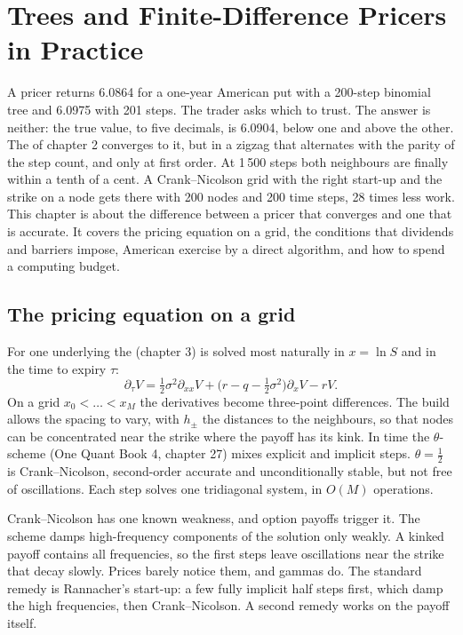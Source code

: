 \chapter{Trees and Finite-Difference Pricers in Practice}\label{ch:dv:trees-and-finite-difference-pricers-in-practice}

A pricer returns 6.0864 for a one-year American put with a 200-step binomial tree and 6.0975 with 201 steps. The trader
asks which to trust. The answer is neither: the true value, to five decimals, is 6.0904, below one and above the other. The
 of chapter 2 converges to it, but in a zigzag that alternates with the parity of the step count,
and only at first order. At 1\,500 steps both neighbours are finally within a tenth of a cent. A Crank--Nicolson grid with the
right start-up and the strike on a node gets there with 200 nodes and 200 time steps, 28 times less work. This chapter is about
the difference between a pricer that converges and one that is accurate. It covers the pricing equation on a grid, the
conditions that dividends and barriers impose, American exercise by a direct algorithm, and how to spend a computing budget.

\section{The pricing equation on a grid}

For one underlying the  (chapter 3) is solved most naturally in $x=\ln S$ and in the time to expiry
$\tau$:
\[
\partial_\tau V=\tfrac12\sigma^2\partial_{xx}V+\bigl(r-q-\tfrac12\sigma^2\bigr)\partial_xV-rV.
\]
On a grid $x_0<\dots<x_M$ the derivatives become three-point differences. The build allows the spacing to vary, with
$h_\pm$ the distances to the neighbours, so that nodes can be concentrated near the strike where the payoff has its kink.
In time the $\theta$-scheme (One Quant Book 4, chapter 27) mixes explicit and implicit steps. $\theta=\frac12$ is
Crank--Nicolson, second-order accurate and unconditionally stable, but not free of oscillations. Each step solves one
tridiagonal system, in $O(M)$ operations.

Crank--Nicolson has one known weakness, and option payoffs trigger it. The scheme damps high-frequency components of the
solution only weakly. A kinked payoff contains all frequencies, so the first steps leave oscillations near the strike that
decay slowly. Prices barely notice them, and gammas do. The standard remedy is Rannacher's start-up: a few fully implicit half
steps first, which damp the high frequencies, then Crank--Nicolson. A second remedy works on the payoff itself.

